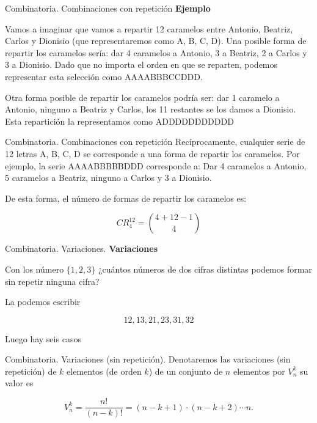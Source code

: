 \documentclass[
  ignorenonframetext,
  aspectratio=169]{beamer}
\begin{document}
\begin{frame}{Combinatoria. Combinaciones con repetición}
\protect\hypertarget{combinatoria.-combinaciones-con-repeticiuxf3n-1}{}
\textbf{Ejemplo}

Vamos a imaginar que vamos a repartir 12 caramelos entre Antonio,
Beatriz, Carlos y Dionisio (que representaremos como A, B, C, D). Una
posible forma de repartir los caramelos sería: dar 4 caramelos a
Antonio, 3 a Beatriz, 2 a Carlos y 3 a Dionisio. Dado que no importa el
orden en que se reparten, podemos representar esta selección como
AAAABBBCCDDD.

Otra forma posible de repartir los caramelos podría ser: dar 1 caramelo
a Antonio, ninguno a Beatriz y Carlos, los 11 restantes se los damos a
Dionisio. Esta repartición la representamos como ADDDDDDDDDDD
\end{frame}

\begin{frame}{Combinatoria. Combinaciones con repetición}
\protect\hypertarget{combinatoria.-combinaciones-con-repeticiuxf3n-2}{}
Recíprocamente, cualquier serie de 12 letras A, B, C, D se corresponde a
una forma de repartir los caramelos. Por ejemplo, la serie AAAABBBBBDDD
corresponde a: Dar 4 caramelos a Antonio, 5 caramelos a Beatriz, ninguno
a Carlos y 3 a Dionisio.

De esta forma, el número de formas de repartir los caramelos es:

\[CR_{4}^{12} = \binom{4+12-1}{4}\]
\end{frame}

\begin{frame}{Combinatoria. Variaciones.}
\protect\hypertarget{combinatoria.-variaciones.}{}
\textbf{Variaciones}

Con los número \(\{1,2,3\}\) ¿cuántos números de dos cifras distintas
podemos formar sin repetir ninguna cifra?

La podemos escribir

\[12,13,21,23,31,32\]

Luego hay seis casos
\end{frame}

\begin{frame}{Combinatoria. Variaciones (sin repetición).}
\protect\hypertarget{combinatoria.-variaciones-sin-repeticiuxf3n.}{}
Denotaremos las variaciones (sin repetición) de \(k\) elementos (de
orden \(k\)) de un conjunto de \(n\) elementos por \(V_n^k\) su valor es

\[
V_n^k=\frac{n!}{(n-k)!}=(n-k+1)\cdot (n-k+2)\cdots n.
\]
\end{frame}
\end{document}
